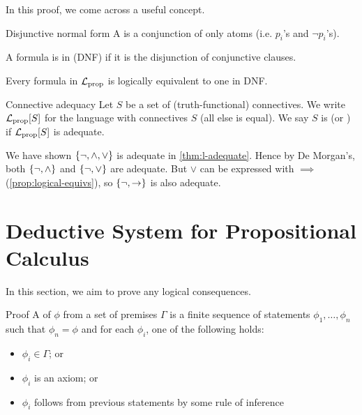 \documentclass{styles/tufte}
\begin{document}
  In this proof, we come across a useful concept.
  \begin{definition}{Disjunctive normal form}{}
    A  is a conjunction of only atoms (i.e. $p_i$'s and $\neg p_i$'s).
    
    A formula is in  (DNF) if it is the disjunction of conjunctive clauses.
  \end{definition}
  
  \begin{corollary}{}{}
    Every formula in $\mathcal{L}_\textrm{prop}$ is logically equivalent to one in DNF.
  \end{corollary}
  
  \begin{definition}{Connective adequacy}{}
    \vspace{-0.3em}
    Let $S$ be a set of (truth-functional) connectives. We write $\mathcal{L}_\textrm{prop}[S]$ for the language with connectives $S$ (all else is equal). We say $S$ is  (or ) if $\mathcal{L}_\textrm{prop}[S]$ is adequate.
  \end{definition}
  
  We have shown $\set{\neg, \land, \lor}$ is adequate in \cref{thm:l-adequate}. Hence by De Morgan's, both $\set{\neg, \land}$ and $\set{\neg, \lor}$ are adequate. But $\lor$ can be expressed with $\implies$ (\cref{prop:logical-equivs}), so $\set{\neg, \rightarrow}$ is also adequate.



\section{Deductive System for Propositional Calculus}

In this section, we aim to prove any logical consequences.

\begin{definition}{Proof}{}
  A  of $\phi$ from a set of premises $\Gamma$ is a finite sequence of statements $\phi_1, \dots, \phi_n$ such that $\phi_n = \phi$ and for each $\phi_i$, one of the following holds:
  \begin{itemize}
    \item $\phi_i \in \Gamma$; or
    \item $\phi_i$ is an axiom; or
    \item $\phi_i$ follows from previous statements by some rule of inference
  \end{itemize}
\end{definition}
\end{document}
